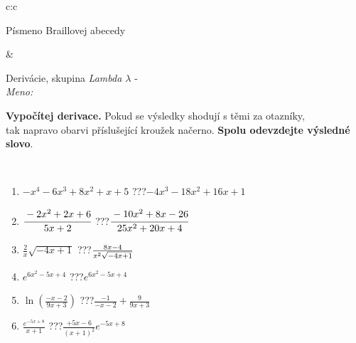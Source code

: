 \documentclass[10pt]{report}
\begin{document}
\begin{tabular}{c:c}
\begin{minipage}[c][104.5mm][t]{0.5\linewidth}
\begin{center}
\begin{minipage}{0.20\linewidth}
\begin{center}
{\small Písmeno Braillovej abecedy}
\end{center}
\end{minipage}
\end{center}
\end{minipage}
&
\begin{minipage}[c][104.5mm][t]{0.5\linewidth}
\begin{center}
\vspace{7mm}
{\huge Derivácie, skupina \textit{Lambda $\lambda$} -}\\[5mm]
\textit{Meno:}\phantom{xxxxxxxxxxxxxxxxxxxxxxxxxxxxxxxxxxxxxxxxxxxxxxxxxxxxxxxxxxxxxxxxx}\\[5mm]
\begin{minipage}{0.95\linewidth}
\begin{center}
\textbf{Vypočítej derivace.} Pokud se výsledky shodují s těmi za otazníky,\\tak napravo obarvi příslušející kroužek načerno. \textbf{Spolu odevzdejte výsledné slovo}.
\end{center}
\end{minipage}
\\[1mm]
\begin{minipage}{0.79\linewidth}
\begin{center}
\begin{varwidth}{\linewidth}
\begin{enumerate}
\normalsize
\item $-x^4-6x^3+8x^2+x+5$\quad \dotfill\; ???\;\dotfill \quad $-4x^3-18x^2+16x+1$
\item $\cfrac{-2x^2+2x+6}{5x+2}$\quad \dotfill\; ???\;\dotfill \quad $\cfrac{-10x^2+8x-26}{25x^2+20x+4}$
\item $\frac{2}{x}\sqrt{-4x+1}$\quad \dotfill\; ???\;\dotfill \quad $\frac{8x-4}{x^2 \sqrt{\smash[b]{-4x+1}}}$
\item $e^{6x^2-5x+4}$\quad \dotfill\; ???\;\dotfill \quad $e^{6x^2-5x+4}$
\item $\ln{\left(\frac{-x-2}{9x+3}\right)}$\quad \dotfill\; ???\;\dotfill \quad $\frac{-1}{-x-2}+\frac{9}{9x+3}$
\item $\frac{e^{-5x+8}}{x+1}$\quad \dotfill\; ???\;\dotfill \quad $\frac{+5x-6}{(x+1)^2}e^{-5x+8}$
\end{enumerate}
\end{varwidth}
\end{center}
\end{minipage}
\begin{minipage}{0.20\linewidth}
\begin{center}

\end{center}
\end{minipage}
\end{center}
\end{minipage}
\end{tabular}
\end{document}
